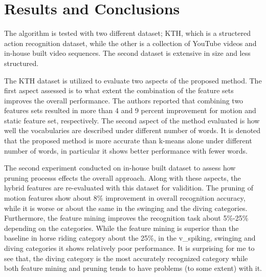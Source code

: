 \documentclass[11pt]{article}
\begin{document}
\section{Results and Conclusions}
The algorithm is tested with two different dataset; KTH, which is a structered action recognition dataset, while the other is a collection of YouTube videos and in-house built video sequences.
The second dataset is extensive in size and less structured.

The KTH dataset is utilized to evaluate two aspects of the proposed method.
The first aspect assessed is to what extent the combination of the feature sets improves the overall performance.
The authors reported that combining two features sets resulted in more than 4 and 9 percent improvement for motion and static feature set, respectively.
The second aspect of the method evaluated is how well the vocabularies are described under different number of words.
It is denoted that the proposed method is more accurate than k-means alone under different number of words, in particular it shows better performance with fewer words.

The second experiment conducted on in-house built dataset to assess how pruning processs effects the overall approach.
Along with these aspects, the hybrid features are re-evaluated with this dataset for validition.
The pruning of motion features show about 8\% improvement in overall recognition accuracy, while it is worse or about the same in the swinging and the diving categories.
Furthermore, the feature mining improves the recognition task about 5\%-25\% depending on the categories.
While the feature mining is superior than the baseline in horse riding category about the 25\%, in the v\_spiking, swinging and diving categories it shows relatively poor performance.
It is surprising for me to see that, the diving category is the most accurately recognized category while both feature mining and pruning tends to have problems (to some extent) with it.
% 
% 
\end{document}
